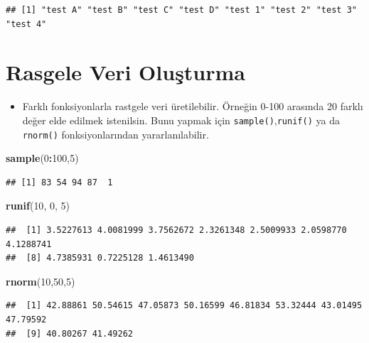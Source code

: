 \documentclass[
  oneside]{book}
\newenvironment{Shaded}{\begin{snugshade}}{\end{snugshade}}
\newcommand{\DecValTok}[1]{\textcolor[rgb]{0.00,0.00,0.81}{#1}}
\newcommand{\FunctionTok}[1]{\textcolor[rgb]{0.13,0.29,0.53}{\textbf{#1}}}
\newcommand{\NormalTok}[1]{#1}
\newcommand{\SpecialCharTok}[1]{\textcolor[rgb]{0.81,0.36,0.00}{\textbf{#1}}}
\providecommand{\tightlist}{%
  \setlength{\itemsep}{0pt}\setlength{\parskip}{0pt}}
\begin{document}
\begin{verbatim}
## [1] "test A" "test B" "test C" "test D" "test 1" "test 2" "test 3" "test 4"
\end{verbatim}

\hypertarget{rasgele-veri-oluux15fturma}{%
\section{Rasgele Veri Oluşturma}\label{rasgele-veri-oluux15fturma}}

\begin{itemize}
\tightlist
\item
  Farklı fonksiyonlarla rastgele veri üretilebilir. Örneğin 0-100 arasında 20 farklı değer elde edilmek istenilsin. Bunu yapmak için \texttt{sample()},\texttt{runif()} ya da \texttt{rnorm()} fonksiyonlarından yararlanılabilir.
\end{itemize}

\begin{Shaded}
\begin{Highlighting}[]
\FunctionTok{sample}\NormalTok{(}\DecValTok{0}\SpecialCharTok{:}\DecValTok{100}\NormalTok{,}\DecValTok{5}\NormalTok{)}
\end{Highlighting}
\end{Shaded}

\begin{verbatim}
## [1] 83 54 94 87  1
\end{verbatim}

\begin{Shaded}
\begin{Highlighting}[]
\FunctionTok{runif}\NormalTok{(}\DecValTok{10}\NormalTok{,  }\DecValTok{0}\NormalTok{, }\DecValTok{5}\NormalTok{)}
\end{Highlighting}
\end{Shaded}

\begin{verbatim}
##  [1] 3.5227613 4.0081999 3.7562672 2.3261348 2.5009933 2.0598770 4.1288741
##  [8] 4.7385931 0.7225128 1.4613490
\end{verbatim}

\begin{Shaded}
\begin{Highlighting}[]
\FunctionTok{rnorm}\NormalTok{(}\DecValTok{10}\NormalTok{,}\DecValTok{50}\NormalTok{,}\DecValTok{5}\NormalTok{)}
\end{Highlighting}
\end{Shaded}

\begin{verbatim}
##  [1] 42.88861 50.54615 47.05873 50.16599 46.81834 53.32444 43.01495 47.79592
##  [9] 40.80267 41.49262
\end{verbatim}
\end{document}
